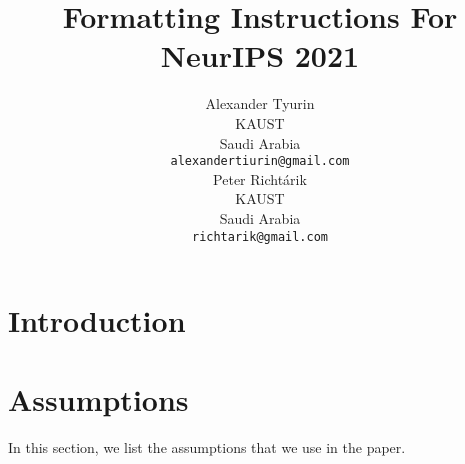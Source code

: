 \documentclass{article}
\title{Formatting Instructions For NeurIPS 2021}
\author{%
  Alexander Tyurin\\
  KAUST\\
  Saudi Arabia\\
  \texttt{alexandertiurin@gmail.com} \\
  \And
  Peter Richt\'{a}rik \\
  KAUST\\
  Saudi Arabia\\
  \texttt{richtarik@gmail.com} \\
}
\begin{document}
\maketitle

\begin{abstract}
\end{abstract}

\section{Introduction}

\section{Assumptions}

In this section, we list the assumptions that we use in the paper.
\end{document}
